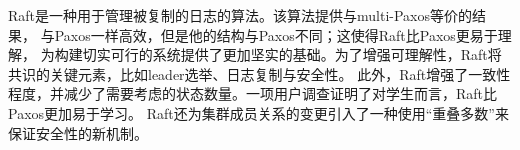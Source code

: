 
\begin{CHSabstract}
    Raft是一种用于管理被复制的日志的算法。该算法提供与multi-Paxos等价的结果，
    与Paxos一样高效，但是他的结构与Paxos不同；这使得Raft比Paxos更易于理解，
    为构建切实可行的系统提供了更加坚实的基础。为了增强可理解性，Raft将共识的关键元素，比如leader选举、日志复制与安全性。
    此外，Raft增强了一致性程度，并减少了需要考虑的状态数量。一项用户调查证明了对学生而言，Raft比Paxos更加易于学习。
    Raft还为集群成员关系的变更引入了一种使用“重叠多数”来保证安全性的新机制。
\end{CHSabstract}

